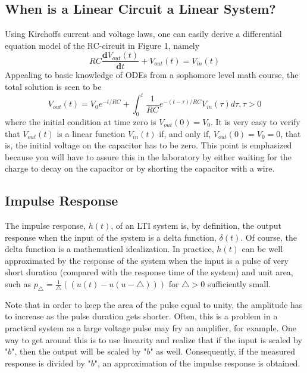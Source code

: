 \documentclass[12pt]{article}
\begin{document}
\subsection{When is a Linear Circuit a Linear System?}
Using Kirchoffs current and voltage laws, one can easily derive a differential equation model of the RC-circuit
in Figure 1, namely
\begin{equation}
RC\frac{\mathbf{d}V_{out}(t)}{\mathbf{d}t}+V_{out}(t)=V_{in}(t)
\end{equation}
Appealing to basic knowledge of ODEs from a sophomore level math course, the total solution is seen to be
\begin{equation}
V_{out}(t)=V_0e^{-t/RC}+\int_0^t\frac{1}{RC}e^{-(t-\tau)/RC}V_{in}(\tau)d\tau,\tau>0
\end{equation}
where the initial condition at time zero is $V_{out}(0) = V_0$. It is very easy to verify that $V_{out}(t)$ is a linear
function $V_{in}(t)$ if, and only if, $V_{out}(0)=V_0=0$, that is, the initial voltage on the capacitor has to be zero.
This point is emphasized because you will have to assure this in the laboratory by either waiting for the
charge to decay on the capacitor or by shorting the capacitor with a wire.
\subsection{Impulse Response}
The impulse response, $h(t)$, of an LTI system is, by definition, the output response when the input of the
system is a delta function, $\delta(t)$. Of course, the delta function is a mathematical idealization. In practice,
$h(t)$ can be well approximated by the response of the system when the input is a pulse of very short duration
(compared with the response time of the system) and unit area, such as 
$p_{\bigtriangleup}=\frac{1}{\bigtriangleup}((u(t)-u(u-\bigtriangleup)))$ for $\bigtriangleup>0$ sufficiently small.
\par Note that in order to keep the area of the pulse equal to unity, the amplitude has to increase as the pulse
duration gets shorter. Often, this is a problem in a practical system as a large voltage pulse may fry an
amplifier, for example. One way to get around this is to use linearity and realize that if the input is scaled
by "$b$", then the output will be scaled by "$b$" as well. Consequently, if the measured response is divided by
"$b$", an approximation of the impulse response is obtained.
\end{document}
